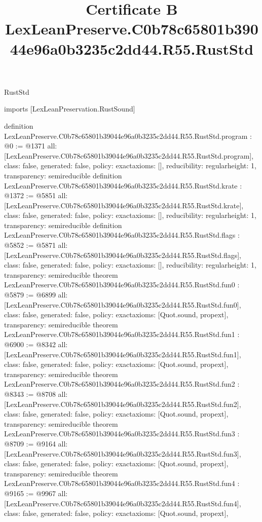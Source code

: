 \begin{lexlean}{RustStd}
\title{Certificate B LexLeanPreserve.C0b78c65801b39044e96a0b3235c2dd44.R55.RustStd}
\begin{coremodule}
imports [LexLeanPreservation.RustSound]

definition LexLeanPreserve.C0b78c65801b39044e96a0b3235c2dd44.R55.RustStd.program : @0 := @1371 {
  all: [LexLeanPreserve.C0b78c65801b39044e96a0b3235c2dd44.R55.RustStd.program],
  class: false,
  generated: false,
  policy: exact{axioms: []},
  reducibility: regular{height: 1},
  transparency: semireducible
}
definition LexLeanPreserve.C0b78c65801b39044e96a0b3235c2dd44.R55.RustStd.krate : @1372 := @5851 {
  all: [LexLeanPreserve.C0b78c65801b39044e96a0b3235c2dd44.R55.RustStd.krate],
  class: false,
  generated: false,
  policy: exact{axioms: []},
  reducibility: regular{height: 1},
  transparency: semireducible
}
definition LexLeanPreserve.C0b78c65801b39044e96a0b3235c2dd44.R55.RustStd.flags : @5852 := @5871 {
  all: [LexLeanPreserve.C0b78c65801b39044e96a0b3235c2dd44.R55.RustStd.flags],
  class: false,
  generated: false,
  policy: exact{axioms: []},
  reducibility: regular{height: 1},
  transparency: semireducible
}
theorem LexLeanPreserve.C0b78c65801b39044e96a0b3235c2dd44.R55.RustStd.fun0 : @5879 := @6899 {
  all: [LexLeanPreserve.C0b78c65801b39044e96a0b3235c2dd44.R55.RustStd.fun0],
  class: false,
  generated: false,
  policy: exact{axioms: [Quot.sound, propext]},
  transparency: semireducible
}
theorem LexLeanPreserve.C0b78c65801b39044e96a0b3235c2dd44.R55.RustStd.fun1 : @6900 := @8342 {
  all: [LexLeanPreserve.C0b78c65801b39044e96a0b3235c2dd44.R55.RustStd.fun1],
  class: false,
  generated: false,
  policy: exact{axioms: [Quot.sound, propext]},
  transparency: semireducible
}
theorem LexLeanPreserve.C0b78c65801b39044e96a0b3235c2dd44.R55.RustStd.fun2 : @8343 := @8708 {
  all: [LexLeanPreserve.C0b78c65801b39044e96a0b3235c2dd44.R55.RustStd.fun2],
  class: false,
  generated: false,
  policy: exact{axioms: [Quot.sound, propext]},
  transparency: semireducible
}
theorem LexLeanPreserve.C0b78c65801b39044e96a0b3235c2dd44.R55.RustStd.fun3 : @8709 := @9164 {
  all: [LexLeanPreserve.C0b78c65801b39044e96a0b3235c2dd44.R55.RustStd.fun3],
  class: false,
  generated: false,
  policy: exact{axioms: [Quot.sound, propext]},
  transparency: semireducible
}
theorem LexLeanPreserve.C0b78c65801b39044e96a0b3235c2dd44.R55.RustStd.fun4 : @9165 := @9967 {
  all: [LexLeanPreserve.C0b78c65801b39044e96a0b3235c2dd44.R55.RustStd.fun4],
  class: false,
  generated: false,
  policy: exact{axioms: [Quot.sound, propext]},
}
\end{coremodule}
\end{lexlean}
